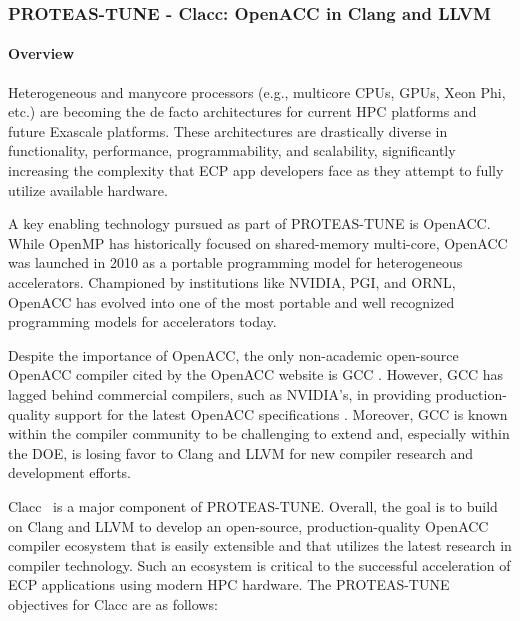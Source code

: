 \subsubsection{ PROTEAS-TUNE - Clacc: OpenACC in Clang and LLVM}\label{s:clacc}


\paragraph{Overview}

Heterogeneous and manycore processors (e.g., multicore CPUs, GPUs,
Xeon Phi, etc.) are becoming the de facto architectures for current
HPC platforms and future Exascale platforms.  These architectures are
drastically diverse in functionality, performance, programmability,
and scalability, significantly increasing the complexity that ECP app
developers face as they attempt to fully utilize available hardware.

A key enabling technology pursued as part of PROTEAS-TUNE is OpenACC.
While OpenMP has historically focused on shared-memory multi-core,
OpenACC was launched in 2010 as a portable programming model for
heterogeneous accelerators.  Championed by institutions like NVIDIA,
PGI, and ORNL, OpenACC has evolved into one of the most portable and
well recognized programming models for accelerators today.

Despite the importance of OpenACC, the only non-academic open-source
OpenACC compiler cited by the OpenACC website is
GCC \cite{openaccOrgTools}.  However, GCC has lagged behind commercial
compilers, such as NVIDIA's, in providing production-quality support
for the latest OpenACC specifications
\cite{openACCValidationSuite}.  Moreover, GCC is known within the compiler
community to be challenging to extend and, especially within the DOE,
is losing favor to Clang and LLVM for new compiler research and
development efforts.

Clacc~\cite{clacc:2018:denny} is a major component of
PROTEAS-TUNE.  Overall, the goal is to build on Clang and LLVM to
develop an open-source, production-quality OpenACC compiler ecosystem
that is easily extensible and that utilizes the latest research in
compiler technology.  Such an ecosystem is critical to the successful
acceleration of ECP applications using modern HPC hardware.  The
PROTEAS-TUNE objectives for Clacc are as follows:


